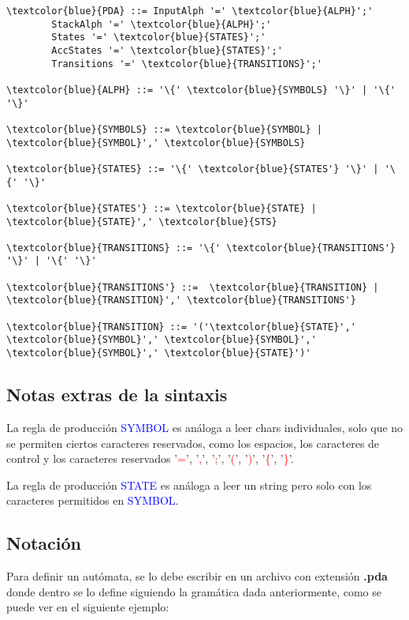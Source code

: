 \documentclass[12pt,a4paper]{article}
\begin{document}
\begin{Verbatim}[commandchars=\\\{\}]
\textcolor{blue}{PDA} ::= InputAlph '=' \textcolor{blue}{ALPH}';'
        StackAlph '=' \textcolor{blue}{ALPH}';'
        States '=' \textcolor{blue}{STATES}';'
        AccStates '=' \textcolor{blue}{STATES}';'
        Transitions '=' \textcolor{blue}{TRANSITIONS}';'

\textcolor{blue}{ALPH} ::= '\{' \textcolor{blue}{SYMBOLS} '\}' | '\{' '\}'

\textcolor{blue}{SYMBOLS} ::= \textcolor{blue}{SYMBOL} | \textcolor{blue}{SYMBOL}',' \textcolor{blue}{SYMBOLS}

\textcolor{blue}{STATES} ::= '\{' \textcolor{blue}{STATES'} '\}' | '\{' '\}'

\textcolor{blue}{STATES'} ::= \textcolor{blue}{STATE} | \textcolor{blue}{STATE}',' \textcolor{blue}{STS}

\textcolor{blue}{TRANSITIONS} ::= '\{' \textcolor{blue}{TRANSITIONS'} '\}' | '\{' '\}'

\textcolor{blue}{TRANSITIONS'} ::=  \textcolor{blue}{TRANSITION} | \textcolor{blue}{TRANSITION}',' \textcolor{blue}{TRANSITIONS'}

\textcolor{blue}{TRANSITION} ::= '('\textcolor{blue}{STATE}',' \textcolor{blue}{SYMBOL}',' \textcolor{blue}{SYMBOL}',' \textcolor{blue}{SYMBOL}',' \textcolor{blue}{STATE}')'
\end{Verbatim}

\subsection*{Notas extras de la sintaxis}
La regla de producción \textcolor{blue}{SYMBOL} es análoga a leer chars individuales,
solo que no se permiten ciertos caracteres reservados, como los espacios, los caracteres
de control y los caracteres reservados '\textcolor{red}{=}', '\textcolor{red}{,}', '\textcolor{red}{;}',
'\textcolor{red}{(}', '\textcolor{red}{)}', '\textcolor{red}{\{}', '\textcolor{red}{\}}'.

La regla de producción \textcolor{blue}{STATE} es análoga a leer un string pero solo
con los caracteres permitidos en \textcolor{blue}{SYMBOL}.

\subsection{Notación}
Para definir un autómata, se lo debe escribir en un archivo con extensión \textbf{.pda}
donde dentro se lo define siguiendo la gramática dada anteriormente, como
se puede ver en el siguiente ejemplo:
\end{document}

